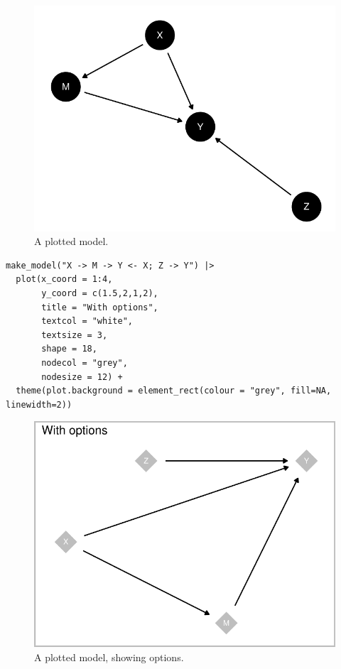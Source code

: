 \documentclass[
  article]{jss}
\begin{document}
\begin{figure}[H]

{\centering \includegraphics{paper_files/figure-pdf/unnamed-chunk-7-1.pdf}

}

\caption{A plotted model.}

\end{figure}

\begin{verbatim}
make_model("X -> M -> Y <- X; Z -> Y") |>
  plot(x_coord = 1:4,
       y_coord = c(1.5,2,1,2),
       title = "With options",
       textcol = "white",
       textsize = 3,
       shape = 18,
       nodecol = "grey",
       nodesize = 12) +
  theme(plot.background = element_rect(colour = "grey", fill=NA, linewidth=2))
\end{verbatim}

\begin{figure}[H]

{\centering \includegraphics{paper_files/figure-pdf/unnamed-chunk-8-1.pdf}

}

\caption{A plotted model, showing options.}

\end{figure}
\end{document}
